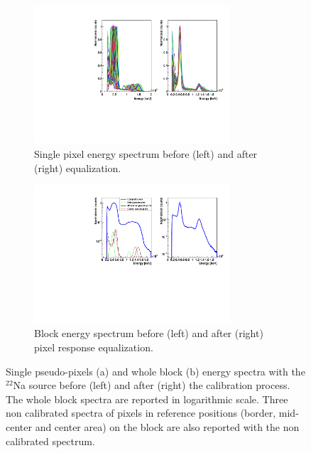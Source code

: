 \begin{figure}
\begin{subfigure}[t]{1\textwidth}
\centering
\includegraphics[width=0.8\textwidth]{03_GraphicFiles/chapter3_CLaRySproto/Absorber/images/EspectraOverlap_noAngles.pdf}
\caption{Single pixel energy spectrum before (left) and after (right) equalization.}
\label{chap3::fig::abssinglePixCal}
\end{subfigure}
\begin{subfigure}[t]{1\textwidth}
\centering
\includegraphics[width=0.8\textwidth]{03_GraphicFiles/chapter3_CLaRySproto/Absorber/images/Espectra_withSingles.pdf}
\caption{Block energy spectrum before (left) and after (right) pixel response equalization.}
\label{chap3::fig::absEspectrumCal}
\end{subfigure}
\caption{Single pseudo-pixels (a) and whole block (b) energy spectra with the $^{22}$Na source before (left) and after (right) the calibration process. The whole block spectra are reported in logarithmic scale. Three non calibrated spectra of pixels in reference positions (border, mid-center and center area) on the block are also reported with the non calibrated spectrum.}
\label{chap3::fig::abspixCal_analysis}
\end{figure}

